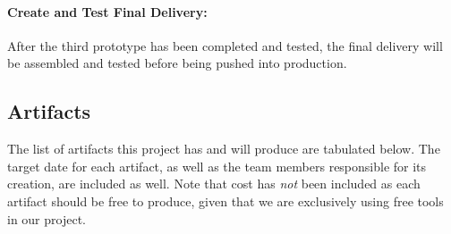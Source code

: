 \documentclass[12pt]{article}
\begin{document}
\paragraph*{Create and Test Final Delivery:}After the third prototype has been completed and tested, the final delivery will be assembled and tested before being pushed into production.

\subsection{Artifacts}
The list of artifacts this project has and will produce are tabulated below. The target date for each artifact, as well as the team members responsible for its creation, are included as well. Note that cost has \emph{not} been included as each artifact should be free to produce, given that we are exclusively using free tools in our project.
\end{document}

